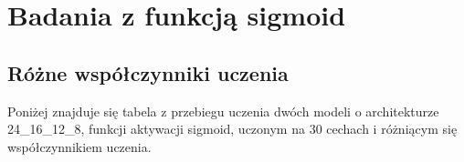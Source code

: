     \vspace{2em}

    \section{Badania z funkcją sigmoid}\label{sec:badaniaZFunkcjąSigmoid}

    \subsection{Różne współczynniki uczenia}\label{subsec:różneWspólczynnikiUczenia}

    Poniżej znajduje się tabela z przebiegu uczenia dwóch modeli o architekturze 24\_16\_12\_8, funkcji aktywacji sigmoid, uczonym na 30 cechach i różniącym się współczynnikiem uczenia.

